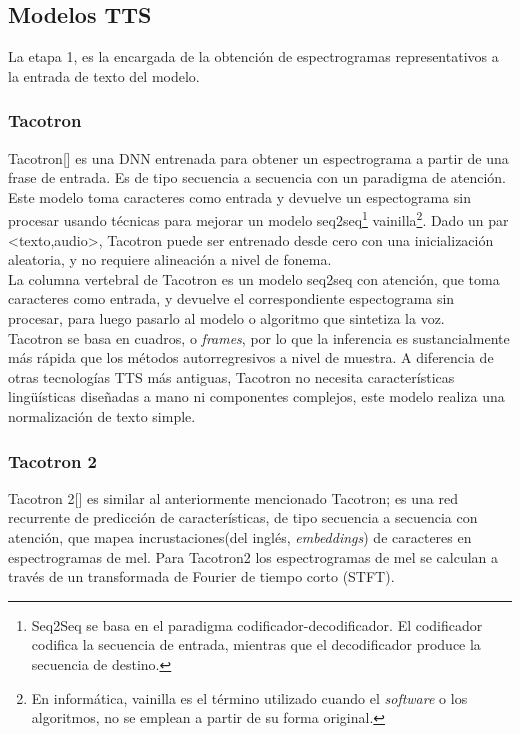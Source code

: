 \subsection{Modelos TTS}
La etapa 1, es la encargada de la obtención de espectrogramas representativos a la entrada de texto del modelo. 

\subsubsection{Tacotron}

Tacotron[\cite{wang2017tacotron}] es una DNN entrenada para obtener un espectrograma a partir de una frase de entrada. Es de tipo secuencia a secuencia con un paradigma de atención. Este modelo toma caracteres como entrada y devuelve un espectograma sin procesar usando técnicas para mejorar un modelo seq2seq\footnote{Seq2Seq se basa en el paradigma codificador-decodificador. El codificador codifica la secuencia de entrada, mientras que el decodificador produce la secuencia de destino.} vainilla\footnote{En informática, vainilla es el término utilizado cuando el \textit{software} o los algoritmos, no se emplean a partir de su forma original.}. Dado un par <texto,audio>, Tacotron puede ser entrenado desde cero con una inicialización aleatoria, y no requiere alineación a nivel de fonema.\\

La columna vertebral de Tacotron es un modelo seq2seq con atención, que toma caracteres como entrada, y devuelve el correspondiente espectograma sin procesar, para luego pasarlo al modelo o algoritmo que sintetiza la voz. \\

Tacotron se basa en cuadros, o \textit{frames}, por lo que la inferencia es sustancialmente más rápida que los métodos autorregresivos a nivel de muestra. A diferencia de otras tecnologías TTS más antiguas, Tacotron no necesita características lingüísticas diseñadas a mano ni componentes complejos, este modelo realiza una normalización de texto simple.


\subsubsection{Tacotron 2}

Tacotron 2[\cite{shen2018natural}] es similar al anteriormente mencionado Tacotron; es una red recurrente de predicción de características, de tipo secuencia a secuencia con atención, que mapea incrustaciones(del inglés, \textit{embeddings}) de caracteres en espectrogramas de mel. Para Tacotron2 los espectrogramas de mel se calculan a través de un transformada de Fourier de tiempo corto (STFT). \\

